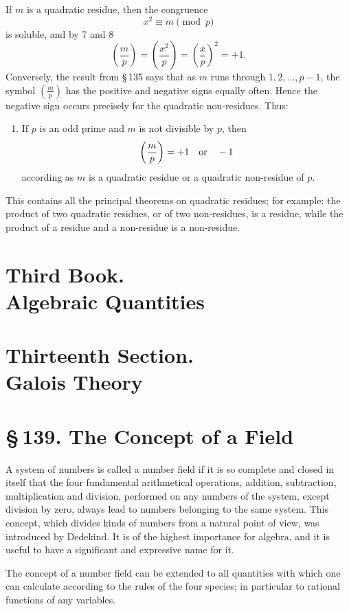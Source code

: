 \documentclass[11pt]{article}
\providecommand{\sect}[2]{\section*{\S\,#1. #2}}
\begin{document}
If $m$ is a quadratic residue, then the congruence
\[
        x^2\equiv m\pmod p
\]
is soluble, and by 7 and 8
\[
        \left(\frac mp\right)
        =\left(\frac{x^2}p\right)
        =\left(\frac xp\right)^2=+1.
\]
Conversely, the result from §\,135 says that as $m$ runs through $1,2,\ldots,p-1$, the symbol $\left(\frac mp\right)$ has the positive and negative signs equally often. Hence the negative sign occurs precisely for the quadratic non-residues. Thus:

\begin{enumerate}[label=\arabic*.,leftmargin=2em,start=11]
\item If $p$ is an odd prime and $m$ is not divisible by $p$, then
\[
        \left(\frac mp\right)=+1\quad\hbox{or}\quad -1
\]
according as $m$ is a quadratic residue or a quadratic non-residue of $p$.
\end{enumerate}

This contains all the principal theorems on quadratic residues; for example: the product of two quadratic residues, or of two non-residues, is a residue, while the product of a residue and a non-residue is a non-residue.

\section*{Third Book.\\Algebraic Quantities}

\section*{Thirteenth Section.\\Galois Theory}

\sect{139}{The Concept of a Field}

A system of numbers is called a number field if it is so complete and closed in itself that the four fundamental arithmetical operations, addition, subtraction, multiplication and division, performed on any numbers of the system, except division by zero, always lead to numbers belonging to the same system. This concept, which divides kinds of numbers from a natural point of view, was introduced by Dedekind. It is of the highest importance for algebra, and it is useful to have a significant and expressive name for it.

The concept of a number field can be extended to all quantities with which one can calculate according to the rules of the four species; in particular to rational functions of any variables.
\end{document}
